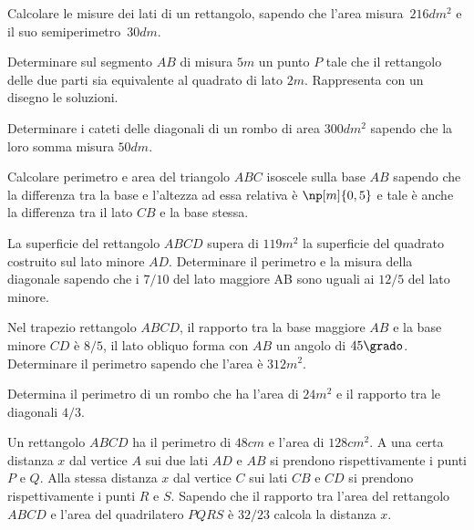 \begin{multicols}{2}
\begin{esercizio}[\Ast] %
 \label{ese:3.152}
Calcolare le misure dei lati di un rettangolo, sapendo che l'area misura~$216\unit{dm^2}$ e il suo semiperimetro~$30\unit{dm}$.
\end{esercizio}

\begin{esercizio}[\Ast]
 \label{ese:3.153}
Determinare sul segmento $ AB $ di misura $ 5\unit{m} $ un punto $ P $ tale che il rettangolo
delle due parti sia equivalente al quadrato di lato $ 2\unit{m} $. Rappresenta con un
disegno le soluzioni.
\end{esercizio}

\begin{esercizio}[\Ast] %
 \label{ese:3.154}
Determinare i cateti delle diagonali di un rombo di area $300\unit{dm^2}$ sapendo che la loro somma misura $50\unit{dm}$.
\end{esercizio}

\begin{esercizio}[\Ast]
 \label{ese:3.155}
Calcolare perimetro e area del triangolo $ ABC $ isoscele sulla base $ AB $ sapendo
che la differenza tra la base e l'altezza ad essa relativa è $\np[m]{0,5}$ e tale
è anche la differenza tra il lato $ CB $ e la base stessa.
\end{esercizio}

\begin{esercizio}[\Ast]
 \label{ese:3.156}
La superficie del rettangolo $ ABCD $ supera di $ 119\unit{m^2} $ la superficie del quadrato
costruito sul lato minore $ AD $. Determinare il perimetro e la misura della
diagonale sapendo che i $ 7/10 $ del lato maggiore AB sono uguali ai $ 12/5 $ del
lato minore.
\end{esercizio}

\begin{esercizio}[\Ast]
 \label{ese:3.157}
Nel trapezio rettangolo $ ABCD $, il rapporto tra la base maggiore $ AB $ e la base
minore $ CD $ è $ 8/5 $, il lato obliquo forma con $ AB $ un angolo di $ 45\grado $. Determinare
il perimetro sapendo che l'area è $312\unit{m^2}$.
\end{esercizio}

\begin{esercizio}[\Ast]
 \label{ese:3.158}
Determina il perimetro di un rombo che ha l'area di $24\unit{m^2}$ e il rapporto tra
le diagonali $ 4/3 $.
\end{esercizio}

\begin{esercizio}[\Ast]
 \label{ese:3.159}
Un rettangolo $ ABCD $ ha il perimetro di $ 48\unit{cm} $ e l'area di $ 128\unit{cm^2} $. A una certa
distanza $x$ dal vertice $ A $ sui due lati $ AD $ e $ AB $ si prendono rispettivamente i
punti $ P $ e $ Q $. Alla stessa distanza $ x $ dal vertice $ C $ sui lati $ CB $ e $ CD $ si
prendono rispettivamente i punti $ R $ e $ S $. Sapendo che il rapporto tra l'area
del rettangolo $ ABCD $ e l'area del quadrilatero $ PQRS $ è $ 32/23 $ calcola la
distanza $x$.
\end{esercizio}


\end{multicols}

